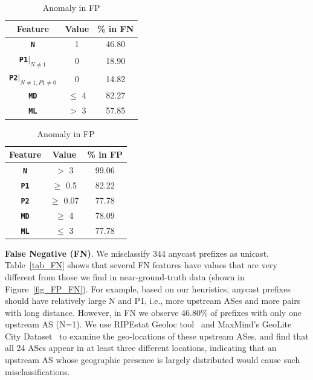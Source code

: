 \begin{table}[t]
\begin{minipage}{.5\linewidth}
\centering
\caption{Anomaly in FN}
\small
\label{tab_FN}
\begin{tabular}{ | c | c | c | }
\hline
Feature & Value & \% in FN \\
\hline
\textbf{\texttt{N}} & 1 & 46.80\\ 
\hline
\textbf{\texttt{P1}}$|_{N\neq1} $ & 0 & 18.90 \\
\hline
\textbf{\texttt{P2}}$|_{N\neq1,P1\neq0} $ & 0 & 14.82 \\
\hline
\textbf{\texttt{MD}} & $\leq$ 4 & 82.27 \\
\hline
\textbf{\texttt{ML}} & $>$ 3 & 57.85\\
\hline
\end{tabular}
\vspace{-3pt}
\end{minipage}\hfill
\begin{minipage}{.5\linewidth}
    \centering
    \caption{Anomaly in FP}
    \small
    \label{tab_FP}
\begin{tabular}{ | c | c | c | }
\hline
Feature & Value & \% in FP \\
\hline
\textbf{\texttt{N}} & $>$ 3 & 99.06\\ 
\hline
\textbf{\texttt{P1}} & $\geq$ 0.5 & 82.22 \\
\hline
\textbf{\texttt{P2}} & $\geq$ 0.07 & 77.78 \\
\hline
\textbf{\texttt{MD}} & $\geq$ 4 & 78.09 \\
\hline
\textbf{\texttt{ML}} & $\leq$ 3 & 77.78\\
\hline
\end{tabular} 
\vspace{-3pt}
\end{minipage}
\end{table}

\vspace{2pt}
\textbf{False Negative (FN)}. We misclassify 344 anycast prefixes as unicast.
Table~\ref{tab_FN} shows that several FN features have values that are very
different from those we find in near-ground-truth data (shown in
Figure~\ref{fig_FP_FN}).
For example, based on our heuristics, anycast prefixes should have relatively
large N and P1, i.e., more upstream ASes and more pairs with long distance.
However, in FN we observe 46.80\% of prefixes with only one upstream AS (N=1).
We use RIPEstat Geoloc tool~\cite{RIPE_GEO} and MaxMind's GeoLite City
Dataset~\cite{MaxMind} to examine the geo-locations of these upstream ASes, and find that all 24 ASes appear in at least three different locations, indicating that an upstream AS whose geographic presence is largely distributed would cause such misclassifications.

